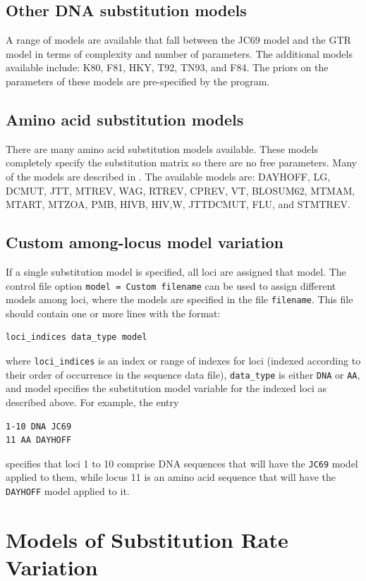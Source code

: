 \documentclass{book}
\numberwithin{equation}{section} \renewcommand{\baselinestretch}{0.55}
\begin{document}
\subsection{Other DNA substitution models}
A range of models are available that fall between the JC69 model and
the GTR model in terms of complexity and number of parameters.
The additional models available include: K80, F81, HKY, T92, TN93, and F84. The
priors on the parameters of these models are pre-specified by the program.
\subsection{Amino acid substitution models}
There are many amino acid substitution models available. These models
completely specify the substitution matrix so there are no free parameters.
Many of the models are described in \citet{Yang2014b}. The available models
are: DAYHOFF, LG, DCMUT, JTT, MTREV, WAG, RTREV, CPREV, VT, BLOSUM62, MTMAM, MTART, MTZOA, PMB, HIVB, HIV,W, JTTDCMUT, FLU, and STMTREV.
\subsection{Custom among-locus model variation}
If a single substitution model is specified, all loci are assigned that model.
The control file option \texttt{model = Custom filename} can be used to assign
different models among loci, where the models are specified in the file \texttt{filename}.
This file should contain one or more lines with the format:
\begin{verbatim}
loci_indices data_type model
\end{verbatim}
where \texttt{loci\_indices} is an index or range of indexes for loci (indexed according to their order of occurrence in the sequence data file),
\texttt{data\_type} is either \texttt{DNA} or \texttt{AA}, and model specifies the substitution model variable for the indexed loci as described above.
For example, the entry
\begin{verbatim}
1-10 DNA JC69
11 AA DAYHOFF
\end{verbatim}
specifies that loci 1 to 10 comprise DNA sequences that will have the \texttt{JC69} model applied to them, while locus 11 is an amino acid sequence
that will have the \texttt{DAYHOFF} model applied to it.
\section{Models of Substitution Rate Variation}
\end{document}
